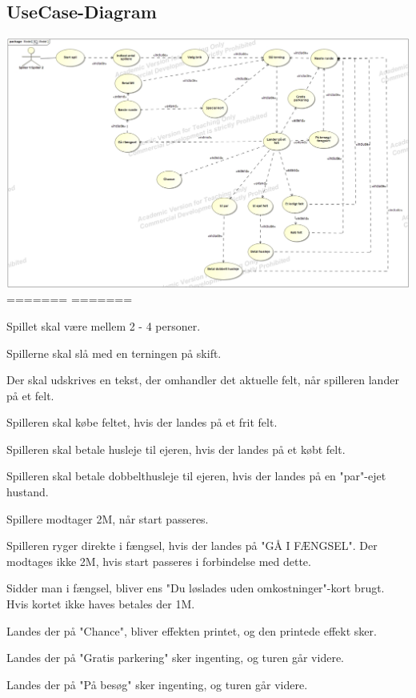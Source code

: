 \subsection{UseCase-Diagram}
\includegraphics[scale=0.8]{fig/dtu/UC-cdio3.jpg}
=======
=======
            \item Spillet skal være mellem 2 - 4 personer.
            \item Spillerne skal slå med en terningen på skift.
            \item Der skal udskrives en tekst, der omhandler det aktuelle felt, når spilleren lander på et felt.
            \item Spilleren skal købe feltet, hvis der landes på et frit felt.
            \item Spilleren skal betale husleje til ejeren, hvis der landes på et købt felt.
            \item Spilleren skal betale dobbelthusleje til ejeren, hvis der landes på en "par"-ejet hustand.
            \item Spillere modtager 2M, når start passeres.
            \item Spilleren ryger direkte i fængsel, hvis der landes på "GÅ I FÆNGSEL". Der modtages ikke 2M, hvis start passeres i forbindelse med dette.
            \item Sidder man i fængsel, bliver ens "Du løslades uden omkostninger"-kort brugt. Hvis kortet ikke haves betales der 1M.
            \item Landes der på "Chance", bliver effekten printet, og den printede effekt sker.
            \item Landes der på "Gratis parkering" sker ingenting, og turen går videre.
            \item Landes der på "På besøg" sker ingenting, og turen går videre.

